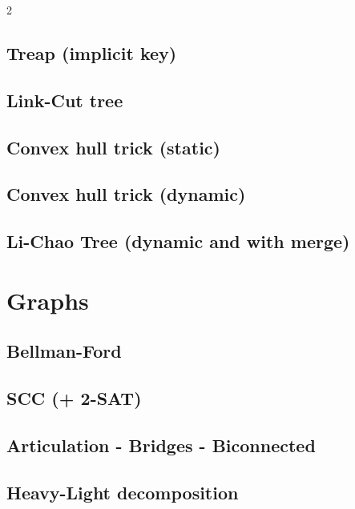 \begin{multicols}{2}
\subsection{Treap (implicit key)}

\subsection{Link-Cut tree}

\subsection{Convex hull trick (static)}

\subsection{Convex hull trick (dynamic)}

\subsection{Li-Chao Tree (dynamic and with merge)}

\section{Graphs}

\subsection{Bellman-Ford}

\subsection{SCC (+ 2-SAT)}

\subsection{Articulation - Bridges - Biconnected}

\subsection{Heavy-Light decomposition}


\end{multicols}

